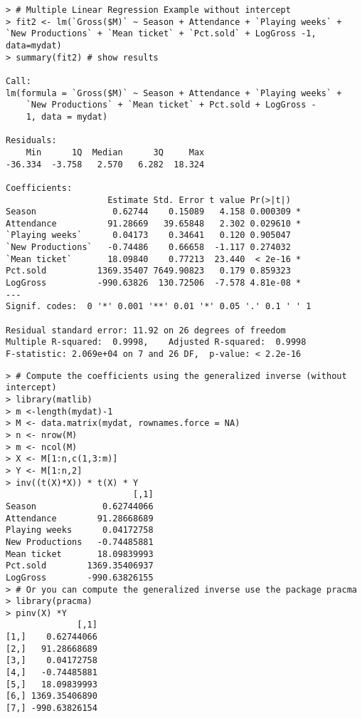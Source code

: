 \begin{frame}[fragile]
\begin{lstlisting}
> # Multiple Linear Regression Example without intercept
> fit2 <- lm(`Gross($M)` ~ Season + Attendance + `Playing weeks` + `New Productions` + `Mean ticket` + `Pct.sold` + LogGross -1, data=mydat)
> summary(fit2) # show results

Call:
lm(formula = `Gross($M)` ~ Season + Attendance + `Playing weeks` +
    `New Productions` + `Mean ticket` + Pct.sold + LogGross -
    1, data = mydat)

Residuals:
    Min      1Q  Median      3Q     Max
-36.334  -3.758   2.570   6.282  18.324

Coefficients:
                    Estimate Std. Error t value Pr(>|t|)
Season               0.62744    0.15089   4.158 0.000309 *
Attendance          91.28669   39.65848   2.302 0.029610 *
`Playing weeks`      0.04173    0.34641   0.120 0.905047
`New Productions`   -0.74486    0.66658  -1.117 0.274032
`Mean ticket`       18.09840    0.77213  23.440  < 2e-16 *
Pct.sold          1369.35407 7649.90823   0.179 0.859323
LogGross          -990.63826  130.72506  -7.578 4.81e-08 *
---
Signif. codes:  0 '*' 0.001 '**' 0.01 '*' 0.05 '.' 0.1 ' ' 1

Residual standard error: 11.92 on 26 degrees of freedom
Multiple R-squared:  0.9998,	Adjusted R-squared:  0.9998
F-statistic: 2.069e+04 on 7 and 26 DF,  p-value: < 2.2e-16
\end{lstlisting}
\end{frame}
\begin{frame}[fragile]
\begin{lstlisting}
> # Compute the coefficients using the generalized inverse (without intercept)
> library(matlib)
> m <-length(mydat)-1
> M <- data.matrix(mydat, rownames.force = NA)
> n <- nrow(M)
> m <- ncol(M)
> X <- M[1:n,c(1,3:m)]
> Y <- M[1:n,2]
> inv((t(X)*X)) * t(X) * Y
                         [,1]
Season             0.62744066
Attendance        91.28668689
Playing weeks      0.04172758
New Productions   -0.74485881
Mean ticket       18.09839993
Pct.sold        1369.35406937
LogGross        -990.63826155
> # Or you can compute the generalized inverse use the package pracma
> library(pracma)
> pinv(X) *Y
              [,1]
[1,]    0.62744066
[2,]   91.28668689
[3,]    0.04172758
[4,]   -0.74485881
[5,]   18.09839993
[6,] 1369.35406890
[7,] -990.63826154
\end{lstlisting}
\end{frame}
